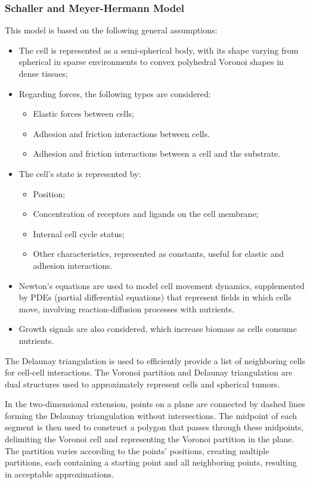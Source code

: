 \subsubsection{Schaller and Meyer-Hermann Model}
This model is based on the following general assumptions:
\begin{itemize}
    \item The cell is represented as a semi-spherical body, with its shape varying from spherical in sparse environments to convex polyhedral Voronoi shapes in dense tissues;
    \item Regarding forces, the following types are considered:
    \begin{itemize}
        \item Elastic forces between cells;
        \item Adhesion and friction interactions between cells.
        \item Adhesion and friction interactions between a cell and the substrate.
        \end{itemize}
  \item  The cell’s state is represented by:
  \begin{itemize}
      \item Position;
      \item Concentration of receptors and ligands on the cell membrane;
      \item Internal cell cycle status;
      \item Other characteristics, represented as constants, useful for elastic and adhesion interactions.
  \end{itemize}
  \item Newton's equations are used to model cell movement dynamics, supplemented by PDEs (partial differential equations) that represent fields in which cells move, involving reaction-diffusion processes with nutrients.
  \item Growth signals are also considered, which increase biomass as cells consume nutrients.
\end{itemize}

The Delaunay triangulation is used to efficiently provide a list of neighboring cells for cell-cell interactions. The Voronoi partition and Delaunay triangulation are dual structures used to approximately represent cells and spherical tumors.

In the two-dimensional extension, points on a plane are connected by dashed lines forming the Delaunay triangulation without intersections. The midpoint of each segment is then used to construct a polygon that passes through these midpoints, delimiting the Voronoi cell and representing the Voronoi partition in the plane. The partition varies according to the points’ positions, creating multiple partitions, each containing a starting point and all neighboring points, resulting in acceptable approximations.

